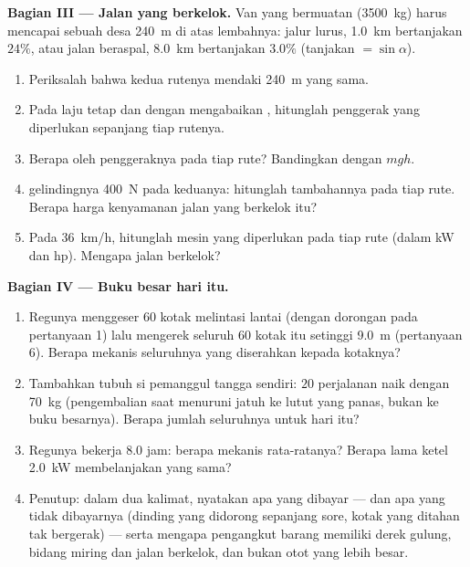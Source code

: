 \begin{problem}
\medskip
\noindent\textbf{Bagian III --- Jalan yang berkelok.}
Van yang bermuatan (\qty{3500}{kg}) harus mencapai sebuah desa
\qty{240}{m} di atas lembahnya: jalur lurus, \qty{1.0}{km} bertanjakan
$24\%$, atau jalan beraspal, \qty{8.0}{km} bertanjakan $3.0\%$
(tanjakan $= \sin\alpha$).
\begin{enumerate}[resume]
  \item Periksalah bahwa kedua rutenya mendaki \qty{240}{m} yang sama.
  \item Pada laju tetap dan dengan mengabaikan , hitunglah 
        penggerak yang diperlukan sepanjang tiap rutenya.
  \item Berapa  oleh  penggeraknya pada tiap rute? Bandingkan
        dengan $mgh$.
  \item {} gelindingnya \qty{400}{N} pada keduanya: hitunglah
         tambahannya pada tiap rute. Berapa harga kenyamanan
        jalan yang berkelok itu?
  \item Pada \qty{36}{km/h}, hitunglah  mesin yang diperlukan pada
        tiap rute (dalam \unit{kW} dan \unit{hp}). Mengapa jalan
        berkelok?
\end{enumerate}

\medskip
\noindent\textbf{Bagian IV --- Buku besar hari itu.}
\begin{enumerate}[resume]
  \item Regunya menggeser $60$ kotak melintasi lantai (dengan dorongan
        pada pertanyaan 1) lalu mengerek seluruh $60$ kotak itu setinggi
        \qty{9.0}{m} (pertanyaan 6). Berapa  mekanis seluruhnya
        yang diserahkan kepada kotaknya?
  \item Tambahkan tubuh si pemanggul tangga sendiri: $20$ perjalanan
        naik dengan \qty{70}{kg} (pengembalian saat menuruni jatuh ke
        lutut yang panas, bukan ke buku besarnya). Berapa jumlah
        seluruhnya untuk hari itu?
  \item Regunya bekerja $8.0$ jam: berapa  mekanis rata-ratanya?
        Berapa lama ketel \qty{2.0}{kW} membelanjakan  yang sama?
  \item Penutup: dalam dua kalimat, nyatakan apa yang dibayar  ---
        dan apa yang tidak dibayarnya (dinding yang didorong sepanjang
        sore, kotak yang ditahan tak bergerak) --- serta mengapa
        pengangkut barang memiliki derek gulung, bidang miring dan
        jalan berkelok, dan bukan otot yang lebih besar.
\end{enumerate}
\end{problem}

